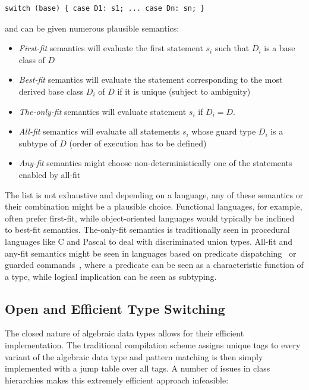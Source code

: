 \begin{lstlisting}[keepspaces]
switch (base) { case D1: s1; ... case Dn: sn; }
\end{lstlisting}

\noindent and can be given numerous plausible semantics:

\begin{itemize}
\setlength{\itemsep}{0pt}
\setlength{\parskip}{0pt}
\item \emph{First-fit} semantics will evaluate the first statement $s_i$ such 
      that $D_i$ is a base class of $D$
\item \emph{Best-fit} semantics will evaluate the statement corresponding to the 
      most derived base class $D_i$ of $D$ if it is unique (subject to 
      ambiguity)
\item \emph{The-only-fit} semantics will evaluate statement $s_i$ if $D_i=D$.
\item \emph{All-fit} semantics will evaluate all statements $s_i$ whose guard 
      type $D_i$ is a subtype of $D$ (order of execution has to be defined)
\item \emph{Any-fit} semantics might choose non-deterministically one of the 
      statements enabled by all-fit
\end{itemize}

\noindent
The list is not exhaustive and depending on a language, any of these semantics 
or their combination might be a plausible choice. Functional languages, for 
example, often prefer first-fit, while object-oriented languages would typically 
be inclined to best-fit semantics. The-only-fit semantics is traditionally seen 
in procedural languages like C and Pascal to deal with discriminated union types. 
All-fit and any-fit semantics might be seen in languages based on predicate 
dispatching~\cite{ErnstKC98} or guarded commands~\cite{EWD:EWD472}, where a 
predicate can be seen as a characteristic function of a type, while logical 
implication can be seen as subtyping.

\subsection{Open and Efficient Type Switching}
\label{sec:poets}

The closed nature of algebraic data types allows for 
their efficient implementation. 
The traditional compilation scheme assigns unique 
tags to every variant of the algebraic data type and pattern matching is then 
simply implemented with a jump table over all tags. A number of issues in 
class hierarchies makes this extremely efficient approach infeasible:

